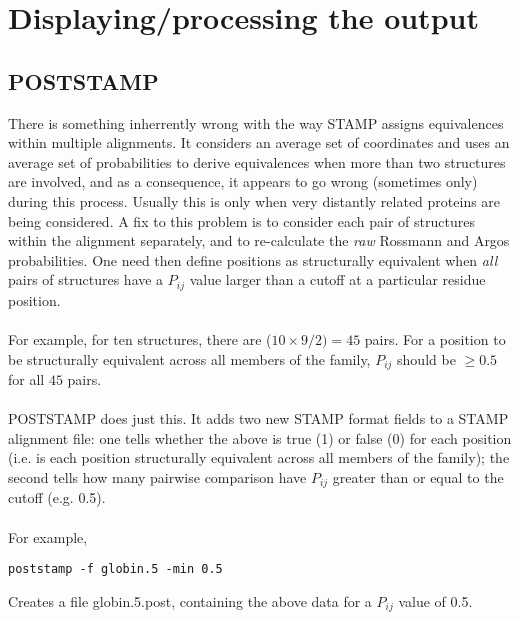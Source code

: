 \section{Displaying/processing the output}

\subsection{POSTSTAMP}

There is something inherrently wrong with the way STAMP assigns 
equivalences within multiple alignments.  It considers an average set of 
\Cal coordinates and uses an average set of probabilities to derive 
equivalences when more than two structures are involved, and as a 
consequence, it appears to go wrong (sometimes only) during this process.  
Usually this is only when very distantly related proteins are being 
considered.  A fix to this problem is to consider each pair of structures 
within the alignment separately, and to re-calculate the {\em raw} 
Rossmann and Argos probabilities.  One need then define positions as 
structurally equivalent when {\em all} pairs of structures have a 
$P_{ij}$ value larger than a cutoff at a particular residue position.\\
\\
For example, for ten structures, there are ($10 \times 9/2) = 45$ pairs.  
For a position to be structurally equivalent across all members of the 
family, $P_{ij}$ should be $ \geq 0.5$ for all $45$ pairs.  \\
\\
POSTSTAMP does just this.  It adds two new STAMP format fields to a STAMP
alignment file: one tells 
whether the above is true (1) or false (0) for each position (i.e. is 
each position structurally equivalent across all members of the family); 
the second tells how many pairwise comparison have $P_{ij}$ greater than 
or equal to the cutoff (e.g. 0.5).\\
\\
For example, \\

\begin{scriptsize}\begin{verbatim}
poststamp -f globin.5 -min 0.5
\end{verbatim} \end{scriptsize}

Creates a file globin.5.post, containing the above data for a $P_{ij}$ 
value of 0.5.\\

